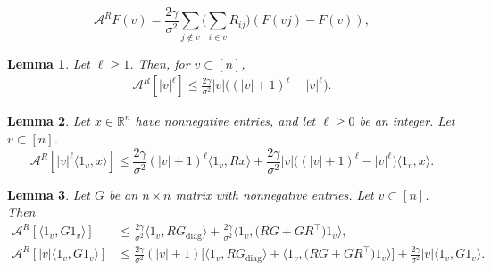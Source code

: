 \documentclass[10pt,a4paper]{amsart}
\newtheorem{lemma}{Lemma}
\def\A{{\mathcal A}}
\def\R{{\mathbb R}}
\begin{document}
\begin{equation}
\A^{R} F(v) = \frac{2\gamma}{\sigma^2}\sum_{j \notin v}\Big(\sum_{i \in v} R_{ij}\Big) (F(vj)-F(v)), \label{eq:AF-basic}
\end{equation}

\begin{lemma} \label{le:AF-polynomial}
Let $\ell \ge 1$. Then, for $v \subset [n]$,
\begin{align}
		\A^{R}[|v|^\ell] \le \frac{2\gamma}{\sigma^2}   |v|\big((|v|+1)^{\ell}-|v|^\ell\big). \label{pf:polynomial1}
		\end{align}
\end{lemma}

\begin{lemma} \label{le:AF-linear}
Let $x \in \R^n$ have nonnegative entries, and let $\ell \ge 0$ be an integer. Let $v \subset [n]$. 
\begin{equation}
\A^{R}[|v|^\ell \langle 1_v,x\rangle ] 
 \le \frac{2\gamma}{\sigma^2}(|v|+1)^\ell \langle 1_v, R x\rangle + \frac{2\gamma}{\sigma^2} |v| \big((|v|+1)^{\ell} - |v|^\ell\big)\langle 1_v, x\rangle . \label{pf:linear1}
\end{equation}
\end{lemma}

\begin{lemma} \label{le:AF-quadratic}
	Let $ G $ be  an $n \times n$ matrix with nonnegative entries. Let $v \subset [n]$. Then
		\begin{align} 
			\A^{R} [\langle 1_v, G1_v\rangle ] &\le \frac{2\gamma}{\sigma^2} \langle 1_v , R G_{\mathrm{diag}}\rangle  + \frac{2\gamma}{\sigma^2}   \langle 1_v, \big( R G +GR^\top \big) 1_v\rangle , \label{eq: AF.bound.0} \\
			\A^{R} [  |v| \langle 1_v, G1_v\rangle ]  &\le \frac{2\gamma}{\sigma^2} (|v|+ 1) \Big[  \langle 1_v , R G_{\mathrm{diag}}\rangle  + \langle 1_v, \big( R G +GR^\top  \big) 1_v\rangle\Big] + \frac{2\gamma}{\sigma^2}  |v|\langle 1_v,G1_v\rangle .  \label{eq: AF.bound.1}
		\end{align} 
\end{lemma}
\end{document}
